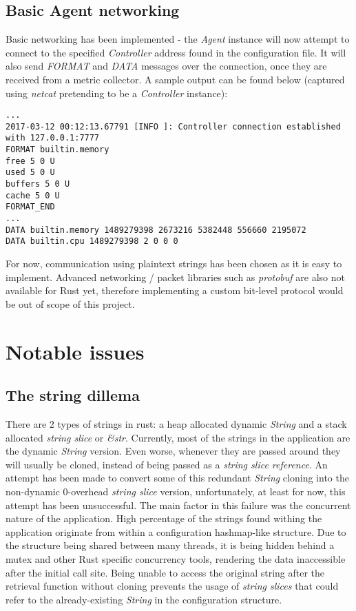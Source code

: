 \documentclass[12pt,a4paper,table]{article}
\begin{document}
        \subsection{Basic Agent networking}
            Basic networking has been implemented - the \textit{Agent} instance will now attempt to connect to the specified \textit{Controller} address found in the configuration file. It will also send \textit{FORMAT} and \textit{DATA} messages over the connection, once they are received from a metric collector. A sample output can be found below (captured using \textit{netcat} pretending to be a \textit{Controller} instance):
\begin{verbatim}
...
2017-03-12 00:12:13.67791 [INFO ]: Controller connection established with 127.0.0.1:7777
FORMAT builtin.memory
free 5 0 U
used 5 0 U
buffers 5 0 U
cache 5 0 U
FORMAT_END
...
DATA builtin.memory 1489279398 2673216 5382448 556660 2195072
DATA builtin.cpu 1489279398 2 0 0 0
\end{verbatim}
            For now, communication using plaintext strings has been chosen as it is easy to implement. Advanced networking / packet libraries such as \textit{protobuf} are also not available for Rust yet, therefore implementing a custom bit-level protocol would be out of scope of this project.


    \section{Notable issues}
        \subsection{The string dillema}
            There are 2 types of strings in rust: a heap allocated dynamic \textit{String} and a stack allocated \textit{string slice} or \textit{\&str}. Currently, most of the strings in the application are the dynamic \textit{String} version. Even worse, whenever they are passed around they will usually be cloned, instead of being passed as a \textit{string slice reference}. An attempt has been made to convert some of this redundant \textit{String} cloning into the non-dynamic 0-overhead \textit{string slice} version, unfortunately, at least for now, this attempt has been unsuccessful. The main factor in this failure was the concurrent nature of the application. High percentage of the strings found withing the application originate from within a configuration hashmap-like structure. Due to the structure being shared between many threads, it is being hidden behind a mutex and other Rust specific concurrency tools, rendering the data inaccessible after the initial call site. Being unable to access the original string after the retrieval function without cloning prevents the usage of \textit{string slices} that could refer to the already-existing \textit{String} in the configuration structure.
\end{document}
